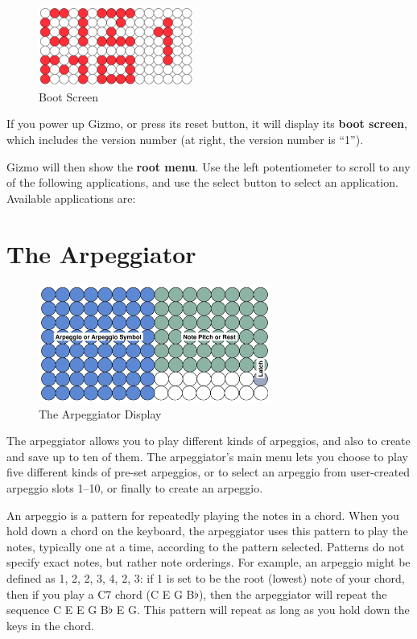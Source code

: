 \documentclass{article}
\begin{document}
\begin{figure}
\vspace{-1.5em}\includegraphics[width=2in]{Gizmo1.pdf}
\vspace{-2em}\caption{\small Boot Screen}\vspace{-2em}
\label{BootScreen}
\end{figure}

If you power up Gizmo, or press its reset button, it will display its {\bf boot screen}, which includes the version number (at right, the version number is ``1'').

Gizmo will then show the {\bf root menu}.  Use the left potentiometer to scroll to any of the following applications, and use the select button to select an application.  Available applications are:
\section {The Arpeggiator}

\begin{figure}
\vspace{-1.5em}\includegraphics[width=3in]{arpeggio.pdf}
\vspace{-2em}\caption{\small The Arpeggiator Display}\vspace{-1em}
\label{arpeggiator}
\end{figure}

The arpeggiator allows you to play different kinds of arpeggios, and also to create and save up to ten of them.  The arpeggiator's main menu lets you choose to play five different kinds of pre-set arpeggios, or to select an arpeggio from user-created arpeggio slots 1--10, or finally to create an arpeggio.

An arpeggio is a pattern for repeatedly playing the notes in a chord.  When you hold down a chord on the keyboard, the arpeggiator uses this pattern to play the notes, typically one at a time, according to the pattern selected.  Patterns do not specify exact notes, but rather note orderings.  For example, an arpeggio might be defined as 1, 2, 2, 3, 4, 2, 3: if 1 is set to be the root (lowest) note of your chord, then if you play a C7 chord (C E G B$\flat$), then the arpeggiator will repeat the sequence C E E G B$\flat$ E G.  This pattern will repeat as long as you hold down the keys in the chord.  
\end{document}
